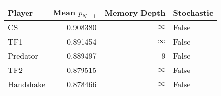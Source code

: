 \begin{tabular}{lrrl}
\toprule
    Player &  Mean $p_{N-1}$ &  Memory Depth & Stochastic \\
\midrule
        CS &        0.908380 &            \(\infty\) &      False \\
       TF1 &        0.891454 &            \(\infty\) &      False \\
  Predator &        0.889497 &             9 &      False \\
       TF2 &        0.879515 &            \(\infty\) &      False \\
 Handshake &        0.878466 &            \(\infty\) &      False \\
\bottomrule
\end{tabular}
